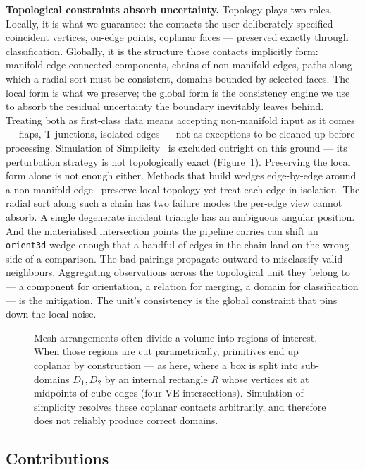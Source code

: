 \documentclass{egpubl}
\begin{document}
\textbf{Topological constraints absorb uncertainty.} Topology plays two roles. Locally, it is what we guarantee: the contacts the user deliberately specified --- coincident vertices, on-edge points, coplanar faces --- preserved exactly through classification. Globally, it is the structure those contacts implicitly form: manifold-edge connected components, chains of non-manifold edges, paths along which a radial sort must be consistent, domains bounded by selected faces. The local form is what we preserve; the global form is the consistency engine we use to absorb the residual uncertainty the boundary inevitably leaves behind. Treating both as first-class data means accepting non-manifold input as it comes --- flaps, T-junctions, isolated edges --- not as exceptions to be cleaned up before processing. Simulation of Simplicity~\cite{EdelsbrunnerMucke1990} is excluded outright on this ground --- its perturbation strategy is not topologically exact (Figure~\ref{fig:sos_box_divider}). Preserving the local form alone is not enough either. Methods that build wedges edge-by-edge around a non-manifold edge~\cite{BohmRunge2025} preserve local topology yet treat each edge in isolation. The radial sort along such a chain has two failure modes the per-edge view cannot absorb. A single degenerate incident triangle has an ambiguous angular position. And the materialised intersection points the pipeline carries can shift an \texttt{orient3d} wedge enough that a handful of edges in the chain land on the wrong side of a comparison. The bad pairings propagate outward to misclassify valid neighbours. Aggregating observations across the topological unit they belong to --- a component for orientation, a relation for merging, a domain for classification --- is the mitigation. The unit's consistency is the global constraint that pins down the local noise.

\begin{figure}[t]
  \centering
  
  \caption{Mesh arrangements often divide a volume into regions of interest. When those regions are cut parametrically, primitives end up coplanar by construction --- as here, where a box is split into sub-domains $D_1, D_2$ by an internal rectangle $R$ whose vertices sit at midpoints of cube edges (four VE intersections). Simulation of simplicity resolves these coplanar contacts arbitrarily, and therefore does not reliably produce correct domains.}
  \label{fig:sos_box_divider}
\end{figure}

\subsection{Contributions}
\label{sec:contributions}
\end{document}
